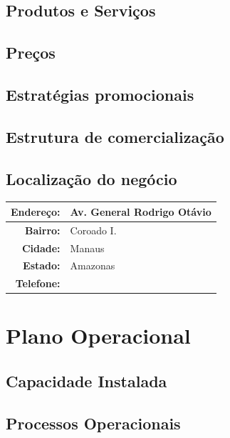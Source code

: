 \documentclass[
	12pt,				%
	openright,			%
	twoside,			%
	a4paper,			%
	english,			%
	french,				%
	spanish,			%
	brazil,				%
	]{abntex2}
\begin{document}
\section{Produtos e Serviços}

\section{Preços}

\section{Estratégias promocionais}

\section{Estrutura de comercialização}

\section{Localização do negócio}

\begin{center}
	\begin{tabular}{|r|p{12cm}|}
		\hline
		\textbf{Endereço:}	& Av. General Rodrigo Otávio \\ \hline
		\textbf{Bairro:}	& Coroado I. \\ \hline
		\textbf{Cidade:}	& Manaus \\ \hline
		\textbf{Estado:}	& Amazonas \\ \hline
		\textbf{Telefone:}	&  \\ \hline
	\end{tabular}
\end{center}



\chapter{Plano Operacional}

\section{Capacidade Instalada}

\section{Processos Operacionais}
\end{document}
